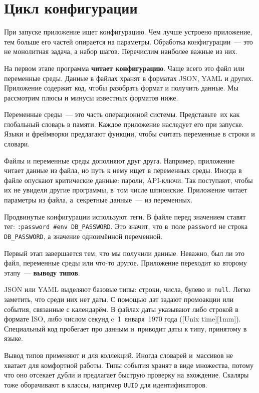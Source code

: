 \section{Цикл конфигурации}

При запуске приложение ищет конфигурацию. Чем лучше устроено приложение, тем
больше его частей опирается на параметры. Обработка конфигурации~--- это не
монолитная задача, а набор шагов. Перечислим наиболее важные из них.

На первом этапе программа \textbf{читает конфигурацию}. Чаще всего это файл или
переменные среды. Данные в файлах хранят в форматах JSON, YAML и
других. Приложение содержит код, чтобы разобрать формат и получить данные. Мы
рассмотрим плюсы и минусы известных форматов ниже.

Переменные среды~--- это часть операционной системы. Представьте~их как глобальный
словарь в памяти. Каждое приложение наследует его при запуске. Языки и
фреймворки предлагают функции, чтобы считать переменные в строки и словари.

Файлы и переменные среды дополняют друг друга. Например, приложение читает
данные из файла, но путь к нему ищет в переменных среды. Иногда в файле опускают
критические данные: пароли, API-ключи. Так поступают, чтобы их не увидели другие
программы, в~том числе шпионские. Приложение читает параметры из файла,
а~секретные данные~--- из переменных.


Продвинутые конфигурации используют теги. В файле перед значением
ставят тег: \verb|:password #env DB_PASSWORD|. Это значит, что в~поле
\verb|password| не строка \verb|DB_PASSWORD|, а значение одноимённой
переменной.

Первый этап завершается тем, что мы получили данные. Неважно, был ли это файл,
переменные среды или что-то другое. Приложение переходит ко второму этапу~---
\textbf{выводу типов}.


JSON или YAML выделяют базовые типы: строки, числа, булево и~\verb|null|. Легко
заметить, что среди них нет даты. С помощью дат задают промоакции или события,
связанные с календарём. В файлах даты указывают либо строкой в формате ISO, либо
числом секунд c~1~января~1970 года ([Unix time][1mm]).
Специальный код пробегает про данным и~приводит даты к типу, принятому в языке.

Вывод типов применяют и для коллекций. Иногда словарей и~массивов не хватает для
комфортной работы. Типы события хранят в виде множества, потому что оно отсекает
дубли и предлагает быструю проверку на вхождение. Скаляры тоже оборачивают в
классы, например \verb|UUID| для идентификаторов.

